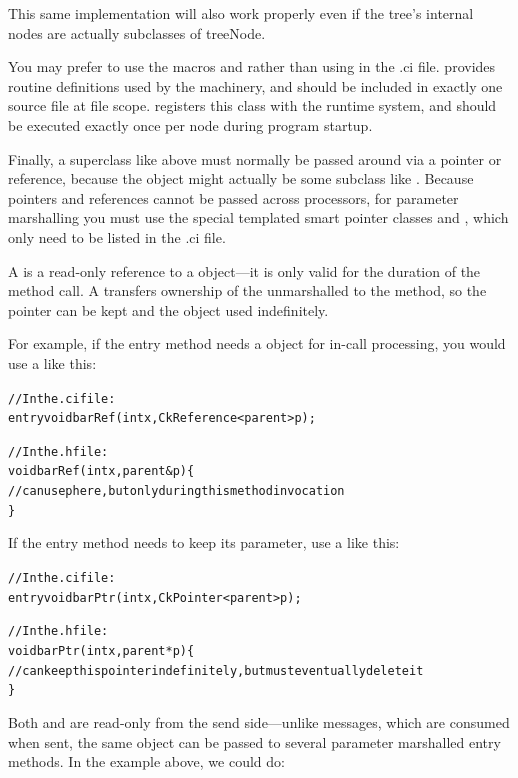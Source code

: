 This same implementation will also work properly even if the tree's
internal nodes are actually subclasses of treeNode.

You may prefer to use the macros 
and  rather than using 
in the .ci file.   provides routine definitions used
by the  machinery, and should be included in exactly one
source file at file scope.   registers this class
with the runtime system, and should be executed exactly once per node 
during program startup.

Finally, a  superclass like  above 
must normally be passed around via a pointer or reference, because the object
might actually be some subclass like .  Because
pointers and references cannot be passed across processors,
for parameter marshalling you must use the special templated 
smart pointer classes  and ,
which only need to be listed in the .ci file.

A  is a read-only reference to a  object---it
is only valid for the duration of the method call.  A 
transfers ownership of the unmarshalled  to the method, so the 
pointer can be kept and the object used indefinitely.  

For example, if the entry method  needs a  
object for in-call processing, you would use a  like this:

\begin{alltt}
// In the .ci file:
    entry void barRef(int x,CkReference<parent> p);

// In the .h file:
    void barRef(int x,parent &p) \{
      // can use p here, but only during this method invocation
    \}
\end{alltt}

If the entry method needs to keep its parameter, use a  like this:
\begin{alltt}
// In the .ci file:
    entry void barPtr(int x,CkPointer<parent> p);

// In the .h file:
    void barPtr(int x,parent *p) \{
      // can keep this pointer indefinitely, but must eventually delete it
    \}
\end{alltt}

Both  and  are read-only from the send 
side---unlike messages, which are consumed when sent, the same object 
can be passed to several parameter marshalled entry methods.
In the example above, we could do:

